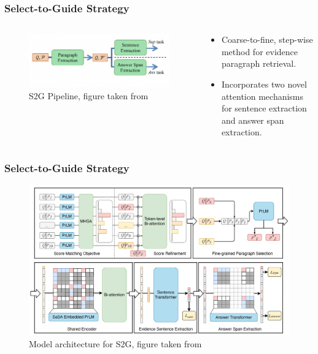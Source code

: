 \documentclass[10pt]{beamer}
\begin{document}
\begin{frame}
  \frametitle{Select-to-Guide Strategy}

  \begin{columns}
    \begin{column}{0.5\textwidth}  
      \begin{figure}
      \begin{center}
       \includegraphics[width=\textwidth]{fig/ext_fig/s2g_pipeline.png}
       \caption{S2G Pipeline, figure taken from \cite{RN106}}
       \end{center}
      \end{figure}
  \end{column}
    \begin{column}{0.5\textwidth}
      \begin{itemize}
        \item Coarse-to-fine, step-wise method for evidence paragraph retrieval. %
        \item Incorporates two novel attention mechanisms for sentence extraction and answer span extraction.
      \end{itemize}
    \end{column}
  \end{columns}

\end{frame}

\begin{frame}
  \frametitle{Select-to-Guide Strategy}

  \begin{figure}[t] %
    \centering
    \includegraphics[width=\linewidth]{fig/ext_fig/s2g_diagram.png} %
    \caption{Model architecture for S2G, figure taken from \cite{RN106}}
    \label{fig:sample_hotpotqa} %
  \end{figure}

\end{frame}
\end{document}

